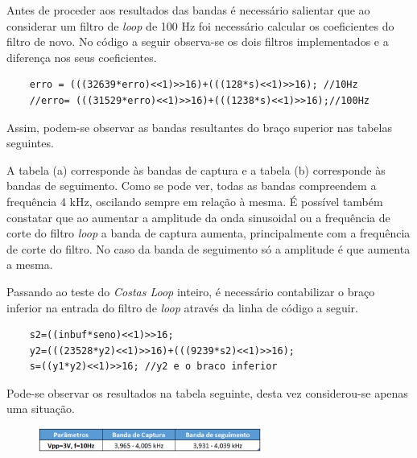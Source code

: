 \documentclass[11pt]{article}
\numberwithin{equation}{section}
\begin{document}
	Antes de proceder aos resultados das bandas é necessário salientar que ao considerar um filtro de \textit{loop} de 100 Hz foi necessário calcular os coeficientes do filtro de novo. No código a seguir observa-se os dois filtros implementados e a diferença nos seus coeficientes. 
	\begin{lstlisting}
	erro = (((32639*erro)<<1)>>16)+(((128*s)<<1)>>16); //10Hz
	//erro= (((31529*erro)<<1)>>16)+(((1238*s)<<1)>>16);//100Hz
	\end{lstlisting}
	
	Assim, podem-se observar as bandas resultantes do braço superior nas tabelas seguintes.
	\begin{figure}[H]
		\centering
		\hspace{6 mm}
	\end{figure}
	
	A tabela (a) corresponde às bandas de captura e a tabela (b) corresponde às bandas de seguimento. Como se pode ver, todas as bandas compreendem a frequência 4 kHz, oscilando sempre em relação à mesma.
	É possível também constatar que ao aumentar a amplitude da onda sinusoidal ou a frequência de corte do filtro \textit{loop} a banda de captura aumenta, principalmente com a frequência de corte do filtro. No caso da banda de seguimento só a amplitude é que aumenta a mesma.
	
	Passando ao teste do \textit{Costas Loop} inteiro, é necessário contabilizar o braço inferior na entrada do filtro de \textit{loop} através da linha de código a seguir.
	\begin{lstlisting}
	s2=((inbuf*seno)<<1)>>16;
	y2=(((23528*y2)<<1)>>16)+(((9239*s2)<<1)>>16);
	s=((y1*y2)<<1)>>16; //y2 e o braco inferior
	\end{lstlisting}
	
	Pode-se observar os resultados na tabela seguinte, desta vez considerou-se apenas uma situação. 
	\begin{figure}[H]
		\centering
		\includegraphics[width=0.65\textwidth]{./tab_costa}~\\
	\end{figure}
	
\end{document}
